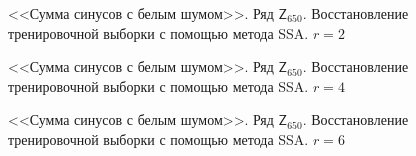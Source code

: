 \documentclass[specialist,
               substylefile = spbu.rtx,
               subf,href,colorlinks=true, 12p]{disser}
\begin{document}
\begin{figure}[H]
	\captionsetup{justification=centering}
	\caption{<<Сумма синусов с белым шумом>>. Ряд $\mathsf{Z}_{650}$. Восстановление тренировочной выборки с помощью метода SSA. $r = 2$}
	\label{edsinr_rec2}
\end{figure}

\begin{figure}[H]
	\captionsetup{justification=centering}
	\caption{<<Сумма синусов с белым шумом>>. Ряд $\mathsf{Z}_{650}$. Восстановление тренировочной выборки с помощью метода SSA. $r = 4$}
	\label{edsinr_rec4}
\end{figure}

\begin{figure}[H]
	\captionsetup{justification=centering}
	\caption{<<Сумма синусов с белым шумом>>. Ряд $\mathsf{Z}_{650}$. Восстановление тренировочной выборки с помощью метода SSA. $r = 6$}
	\label{edsinr_rec6}
\end{figure}
\end{document}
